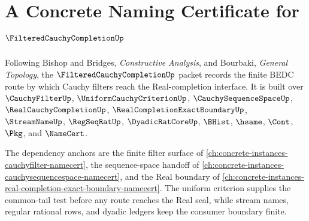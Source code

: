 \chapter{A Concrete Naming Certificate for $\FilteredCauchyCompletionUp$}
\label{ch:concrete-instances-filtered-cauchy-completion-namecert}

Following Bishop and Bridges, \emph{Constructive Analysis}, and Bourbaki,
\emph{General Topology}, the $\FilteredCauchyCompletionUp$ packet records the
finite BEDC route by which Cauchy filters reach the Real-completion interface.
It is built over $\CauchyFilterUp$, $\UniformCauchyCriterionUp$,
$\CauchySequenceSpaceUp$, $\RealCauchyCompletionUp$,
$\RealCompletionExactBoundaryUp$, $\StreamNameUp$, $\RegSeqRatUp$,
$\DyadicRatCoreUp$, $\BHist$, $\hsame$, $\Cont$, $\Pkg$, and $\NameCert$.

The dependency anchors are the finite filter surface of
\autoref{ch:concrete-instances-cauchyfilter-namecert}, the sequence-space
handoff of \autoref{ch:concrete-instances-cauchysequencespace-namecert}, and
the Real boundary of
\autoref{ch:concrete-instances-real-completion-exact-boundary-namecert}. The
uniform criterion supplies the common-tail test before any route reaches the
Real seal, while stream names, regular rational rows, and dyadic ledgers keep
the consumer boundary finite.

